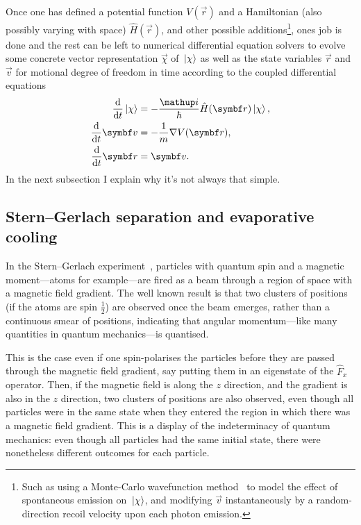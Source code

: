 Once one has defined a potential function $V(\vec r)$ and a Hamiltonian (also possibly varying with space) $\hat H(\vec r)$, and other possible additions\footnote{Such as using a Monte-Carlo wavefunction method~\cite{Molmer:93} to model the effect of spontaneous emission on $\ket\chi$, and modifying $\vec v$ instantaneously by a random-direction recoil velocity upon each photon emission.}, ones job is done and the rest can be left to numerical differential equation solvers to evolve some concrete vector representation $\vec\chi$ of $\ket\chi$ as well as the state variables $\vec r$ and $\vec v$ for motional degree of freedom in time according to the coupled differential equations
\begin{align}\label{eq:simple_semiclassical_first}
\dv{t}\ket\chi &= -\frac\ii\hbar \hat H(\vec r)\ket\chi,\\
\dv{t}\vec v &= -\frac1m\nabla V(\vec r),\\
\dv{t}\vec r &= \vec v\label{eq:simple_semiclassical_last}.
\end{align}
In the next subsection I explain why it's not always that simple.

\subsection{Stern--Gerlach separation and evaporative cooling}

In the Stern--Gerlach experiment~\cite{gerlach_experimentelle_1922}, particles with quantum spin and a magnetic moment---atoms for example---are fired as a beam through a region of space with a magnetic field gradient. The well known result is that two clusters of positions (if the atoms are spin $\frac12$) are observed once the beam emerges, rather than a continuous smear of positions, indicating that angular momentum---like many quantities in quantum mechanics---is quantised.

This is the case even if one spin-polarises the particles before they are passed through the magnetic field gradient, say putting them in an eigenstate of the $\hat F_x$ operator. Then, if the magnetic field is along the $z$ direction, and the gradient is also in the $z$ direction, two clusters of positions are also observed, even though all particles were in the same state when they entered the region in which there was a magnetic field gradient. This is a display of the indeterminacy of quantum mechanics: even though all particles had the same initial state, there were nonetheless different outcomes for each particle.

